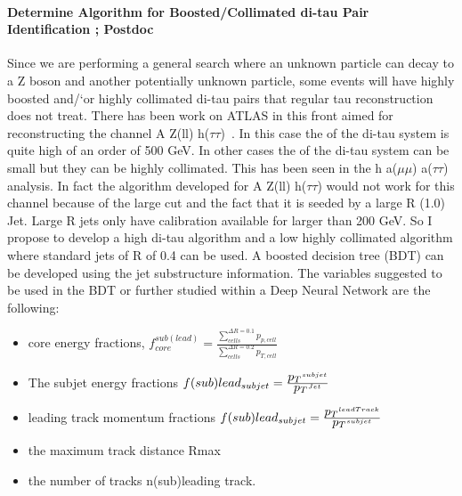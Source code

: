\paragraph{Determine Algorithm for Boosted/Collimated di-tau Pair Identification ; Postdoc} %
Since we are performing a general search where an unknown particle can decay to a Z boson and another potentially unknown particle, some events will have highly boosted and/`or highly collimated di-tau pairs that regular
tau reconstruction does not treat.  There has been work on ATLAS in this front aimed for reconstructing the channel A \too Z(ll) h($\tau\tau$)~\cite{di-tau-thesis}.  In this case the \pt of the di-tau system is quite high of an order of 500 GeV.
In other cases the \pt of the di-tau system can be small but they can be highly collimated.  This has been seen in the h \too a($\mu \mu$) a($\tau \tau$) analysis.  In fact the algorithm developed for A \too Z(ll) h($\tau\tau$) would not 
work for this channel because of the large \pt cut and the fact that it is seeded by a large R (1.0) Jet.  Large R jets only have calibration available for \pt larger than 200 GeV.  So I propose to develop a high \pt di-tau
algorithm and a low \pt highly collimated algorithm where standard jets of R of 0.4 can be used. A boosted decision tree (BDT) can be developed using the jet substructure information.  
The variables suggested to be used in the BDT or further studied within a Deep Neural Network are the following:
\begin{itemize}
\item{core energy fractions, $f_{core}^{sub(lead)}=\frac{\sum_{cells}^{\Delta R=0.1} p_{p,cell}}{\sum_{cells}^{\Delta R=0.2}p_{T,cell}} $}
\item{The subjet energy fractions $f(sub)lead_{subjet}=\frac{\mbox{$p_T$} ^{subjet}}{\mbox{$p_T$} ^{Jet}}$}
\item{leading track momentum fractions $f(sub)lead_{subjet}=\frac{\mbox{$p_T$} ^{leadTrack}}{\mbox{$p_T$} ^{subjet}}$}
\item{the maximum track distance Rmax}
\item{the number of tracks n(sub)leading track.}
\end{itemize}

